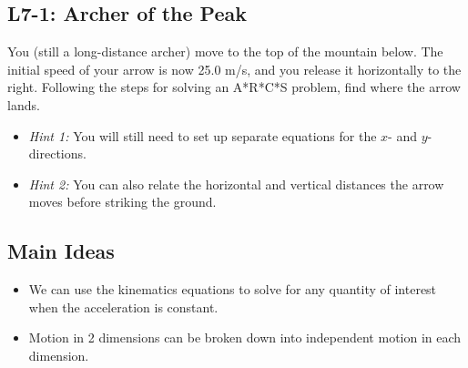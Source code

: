 \documentclass[]{article}
\begin{document}
\begin{PresentSpace}
	\vspace{-10pt}
	\section*{L7-1: Archer of the Peak}
	\vspace{-10pt}
	You (still a long-distance archer) move to the top of the mountain below. The initial speed of your arrow is now 25.0 m/s, and you release it horizontally to the right. Following the steps for solving an A*R*C*S problem, find where the arrow lands.
	\begin{itemize}
		\item \textit{Hint 1:} You will still need to set up separate equations for the $x$- and $y$-directions.
		\item \textit{Hint 2:} You can also relate the horizontal and vertical distances the arrow moves before striking the ground.
	\end{itemize}
	\begin{center}
	\end{center}
\end{PresentSpace}
\newpage
\begin{TeacherMargin}
	
\end{TeacherMargin}
\begin{PresentSpace}
	\section*{Main Ideas}
	\begin{itemize}
		\item We can use the kinematics equations to solve for any quantity of interest when the acceleration is constant.
		\item Motion in 2 dimensions can be broken down into independent motion in each dimension.
	\end{itemize}
\end{PresentSpace}
\end{document}
